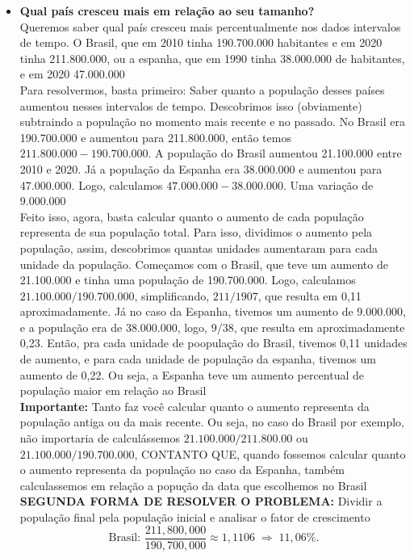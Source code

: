 \documentclass{article}
\begin{document}
\begin{itemize}
    \item \textbf{Qual país cresceu mais em relação ao seu tamanho?}
    \\[5pt]
    Queremos saber qual país cresceu mais percentualmente nos dados intervalos de tempo. O Brasil, que em 2010 tinha 190.700.000 habitantes e em 2020 tinha 211.800.000, ou a espanha, que em 1990 tinha 38.000.000 de habitantes, e em 2020 47.000.000
    \\[5pt]
    Para resolvermos, basta primeiro: Saber quanto a população desses países aumentou nesses intervalos de tempo. Descobrimos isso (obviamente) subtraindo a população no momento mais recente e no passado. No Brasil era 190.700.000 e aumentou para 211.800.000, então temos $211.800.000 - 190.700.000$. A população do Brasil aumentou 21.100.000 entre 2010 e 2020. Já a população da Espanha era 38.000.000 e aumentou para 47.000.000. Logo, calculamos $47.000.000-38.000.000$. Uma variação de 9.000.000
    \\[5pt]
    Feito isso, agora, basta calcular quanto o aumento de cada população representa de sua população total. Para isso, dividimos o aumento pela população, assim, descobrimos quantas unidades aumentaram para cada unidade da população. Começamos com o Brasil, que teve um aumento de 21.100.000 e tinha uma população de 190.700.000. Logo, calculamos $21.100.000/190.700.000$, simplificando, $211/1907$, que resulta em 0,11 aproximadamente. Já no caso da Espanha, tivemos um aumento de 9.000.000, e a população era de 38.000.000, logo, $9/38$, que resulta em aproximadamente 0,23. Então, pra cada unidade de poopulação do Brasil, tivemos 0,11 unidades de aumento, e para cada unidade de população da espanha, tivemos um aumento de 0,22. Ou seja, a Espanha teve um aumento percentual de população maior em relação ao Brasil
    \\[5pt]
    \textbf{Importante:} Tanto faz você calcular quanto o aumento representa da população antiga ou da mais recente. Ou seja, no caso do Brasil por exemplo, não importaria de calculássemos $21.100.000/211.800.00$ ou $21.100.000/190.700.000$, CONTANTO QUE, quando fossemos calcular quanto o aumento representa da população no caso da Espanha, também calculassemos em relação a popução da data que escolhemos no Brasil
    \\[5pt]
    \textbf{SEGUNDA FORMA DE RESOLVER O PROBLEMA:} Dividir a população final pela população inicial e analisar o fator de crescimento
    \[
    \text{Brasil: } 
    \frac{211{,}800{,}000}{190{,}700{,}000} \approx 1{,}1106 
    \;\Rightarrow\; 11{,}06\%.
    \]
    

\end{itemize}
\end{document}
